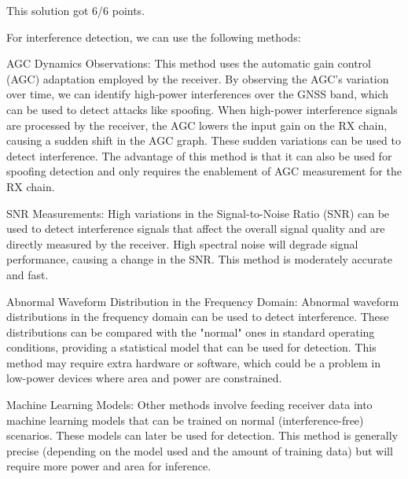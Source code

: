 \begin{solution}
    This solution got 6/6 points.

    For interference detection, we can use the following methods:

    AGC Dynamics Observations: This method uses the automatic gain control (AGC) adaptation employed by the receiver. By observing the AGC's variation over time, we can identify high-power interferences over the GNSS band, which can be used to detect attacks like spoofing. When high-power interference signals are processed by the receiver, the AGC lowers the input gain on the RX chain, causing a sudden shift in the AGC graph. These sudden variations can be used to detect interference. The advantage of this method is that it can also be used for spoofing detection and only requires the enablement of AGC measurement for the RX chain.

    SNR Measurements: High variations in the Signal-to-Noise Ratio (SNR) can be used to detect interference signals that affect the overall signal quality and are directly measured by the receiver. High spectral noise will degrade signal performance, causing a change in the SNR. This method is moderately accurate and fast.

    Abnormal Waveform Distribution in the Frequency Domain: Abnormal waveform distributions in the frequency domain can be used to detect interference. These distributions can be compared with the "normal" ones in standard operating conditions, providing a statistical model that can be used for detection. This method may require extra hardware or software, which could be a problem in low-power devices where area and power are constrained.

    Machine Learning Models: Other methods involve feeding receiver data into machine learning models that can be trained on normal (interference-free) scenarios. These models can later be used for detection. This method is generally precise (depending on the model used and the amount of training data) but will require more power and area for inference.
\end{solution}

